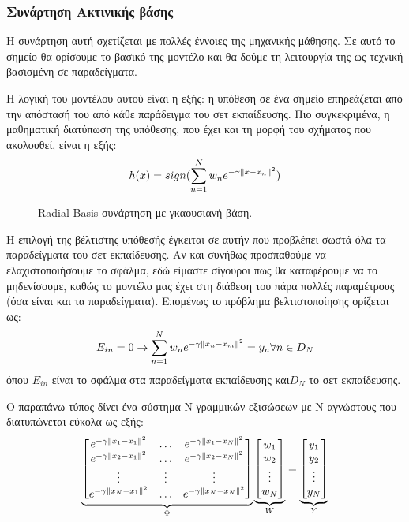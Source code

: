 \subsubsection{Συνάρτηση Ακτινικής βάσης }
Η συνάρτηση αυτή σχετίζεται με πολλές έννοιες της μηχανικής μάθησης. Σε αυτό το σημείο θα ορίσουμε το βασικό της μοντέλο και θα δούμε τη λειτουργία της ως τεχνική βασισμένη σε παραδείγματα. 

Η λογική του  μοντέλου αυτού είναι η εξής: η υπόθεση σε ένα σημείο επηρεάζεται από την απόστασή του από κάθε παράδειγμα του σετ εκπαίδευσης. Πιο συγκεκριμένα, η μαθηματική διατύπωση της υπόθεσης, που έχει και τη μορφή του σχήματος που ακολουθεί, είναι η εξής:
$$h(x)= sign( \sum_{n=1}^{N} w_n e^{-\gamma \left\lVert x - x_n\right\rVert^2})$$
\begin{figure}[H]
	\centering			
	\caption[Radial Basis συνάρτηση με γκαουσιανή βάση]{Radial Basis συνάρτηση με γκαουσιανή βάση.}
\end{figure}
Η επιλογή της βέλτιστης υπόθεσής έγκειται σε αυτήν που προβλέπει σωστά όλα τα παραδείγματα του σετ εκπαίδευσης. Αν και συνήθως προσπαθούμε να ελαχιστοποιήσουμε το σφάλμα, εδώ είμαστε σίγουροι πως θα καταφέρουμε να το μηδενίσουμε, καθώς το μοντέλο μας έχει στη διάθεση του πάρα πολλές παραμέτρους (όσα είναι και τα παραδείγματα). Επομένως το πρόβλημα βελτιστοποίησης ορίζεται ως:
$$E_{in}=0 \rightarrow  \sum_{n=1}^{N} w_n e^{-\gamma \left\lVert x_n - x_m\right\rVert^2}= y_n  \forall n \in D_N $$
όπου $E_{in}$ είναι το σφάλμα στα παραδείγματα εκπαίδευσης και$ D_N$ το σετ εκπαίδευσης. 

Ο παραπάνω τύπος δίνει ένα σύστημα Ν γραμμικών εξισώσεων με Ν αγνώστους που διατυπώνεται εύκολα ως εξής:
\[
\underbrace{
	\begin{bmatrix}
	e^{-\gamma \left\lVert x_1 - x_1\right\rVert^2}  & \dots  &  e^{-\gamma \left\lVert x_1 - x_N\right\rVert^2} \\
	e^{-\gamma \left\lVert x_2 - x_1\right\rVert^2}  & \dots  &  e^{-\gamma \left\lVert x_2 - x_N\right\rVert^2} \\
	\vdots  & \vdots & \vdots \\
	e^{-\gamma \left\lVert x_N - x_1\right\rVert^2}  & \dots  &  e^{-\gamma \left\lVert x_N - x_N\right\rVert^2} \\
	\end{bmatrix}}_{  \Phi}
\underbrace{
	\begin{bmatrix}
	w_{1}       \\
	w_{2}        \\
	\vdots        \\
	w_{N}
	\end{bmatrix}}_{W}
=
\underbrace{
	\begin{bmatrix}
	y_{1}       \\
	y_{2}        \\
	\vdots        \\
	y_{N}
	\end{bmatrix}}_{Y}
\]

